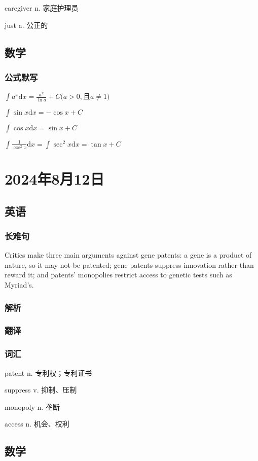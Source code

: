 \documentclass[UTF8]{ctexart}
\begin{document}
caregiver n. 家庭护理员

just a. 公正的
\subsection{数学}
\subsubsection{公式默写}
\begin{multicols}{2}
      $\int a^x\mathrm{d}x=\frac{a^x}{\ln a}+C(a>0,$且$a\ne1)$

      $\int\sin x\mathrm{d}x=-\cos x+C$

      $\int\cos x\mathrm{d}x=\sin x+C$

      $\int\frac{1}{\cos^2x}\mathrm{d}x=\int\sec^2x\mathrm{d}x=\tan x+C$
\end{multicols}
\section{2024年8月12日}
\subsection{英语}
\subsubsection{长难句}
Critics make three main arguments against gene patents: a gene is a product of nature, so it may not be patented; gene patents suppress innovation rather than reward it; and patents' monopolies restrict access to genetic tests such as Myriad's.
\subsubsection{解析}
\subsubsection{翻译}
\subsubsection{词汇}
patent      n.  专利权；专利证书

suppress    v.  抑制、压制

monopoly   n. 垄断

access     n. 机会、权利
\subsection{数学}
\end{document}
